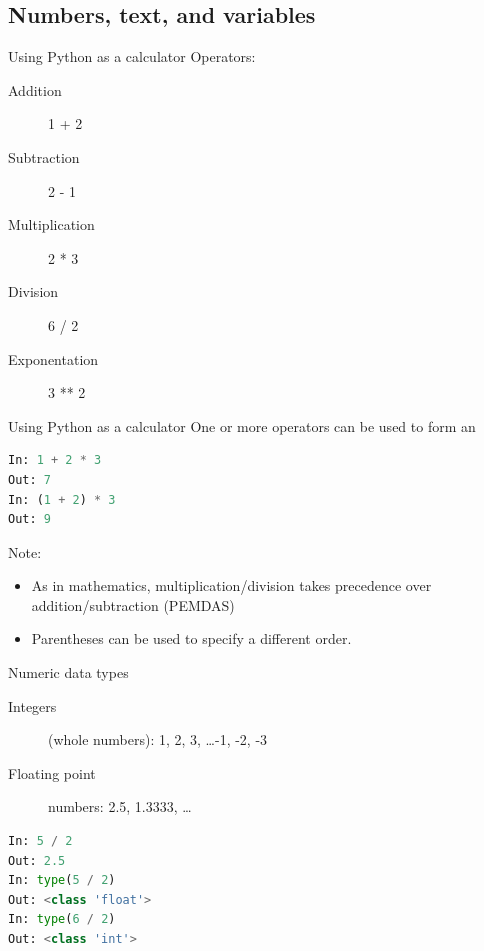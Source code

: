 \documentclass[aspectratio=169,usenames,dvipsnames]{beamer}
\begin{document}
\subsection{Numbers, text, and variables}
\frame{\tableofcontents[currentsubsection]}

\begin{frame}[fragile]{Using Python as a calculator}
Operators:
    \begin{description}
        \item[Addition] 1 + 2
        \item[Subtraction] 2 - 1
        \item[Multiplication] 2 * 3
        \item[Division] 6 / 2
        \item[Exponentation] 3 ** 2
    \end{description}
\end{frame}

\begin{frame}[fragile]{Using Python as a calculator}
One or more operators can be used to form an 
\begin{lstlisting}[language=python]
In: 1 + 2 * 3
Out: 7
In: (1 + 2) * 3
Out: 9
\end{lstlisting}

\pause
Note:
    \begin{itemize}
        \item As in mathematics, multiplication/division takes precedence over
            addition/subtraction (PEMDAS)
        \item Parentheses can be used to specify a different order.
    \end{itemize}
\end{frame}

\begin{frame}[fragile]{Numeric data types}
    \begin{description}
        \item[Integers] (whole numbers): 1, 2, 3, \dots -1, -2, -3
        \item[Floating point] numbers: 2.5, 1.3333, \dots
    \end{description}

\pause
\begin{lstlisting}[language=python]
In: 5 / 2
Out: 2.5
In: type(5 / 2)
Out: <class 'float'>
In: type(6 / 2)
Out: <class 'int'>
\end{lstlisting}
\end{frame}
\end{document}
